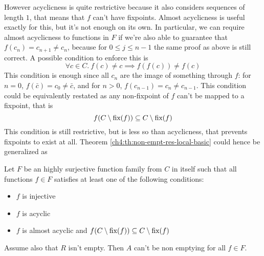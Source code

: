 However acyclicness is quite restrictive because it also considers sequences of length $1$, that means that $f$ can't have fixpoints. Almost acyclicness is useful exactly for this, but it's not enough on its own.
In particular, we can require almost acyclicness to functions in $F$ if we're also able to guarantee that $f(c_n) = c_{n+1} \neq c_n$, because for $0 \le j \le n - 1$ the same proof as above is still correct. A possible condition to enforce this is
\[
\forall c \in C.\ f(c) \neq c \implies f(f(c)) \neq f(c)
\]
This condition is enough since all $c_n$ are the image of something through $f$: for $n = 0$, $f(\bar{c})= c_0 \neq \bar{c}$, and for $n > 0$, $f(c_{n-1}) = c_n \neq c_{n-1}$.
This condition could be equivalently restated as any non-fixpoint of $f$ can't be mapped to a fixpoint, that is
\[
f(C \setminus \text{fix}(f)) \subseteq C \setminus \text{fix}(f)
\]
This condition is still restrictive, but is less so than acyclicness, that prevents fixpoints to exist at all.
Theorem \ref{ch4:th:non-empt-res-local-basic} could hence be generalized as
\begin{theorem}\label{ch4:th:non-empt-res-local}
	Let $F$ be an highly surjective function family from $C$ in itself such that all functions $f \in F$ satisfies at least one of the following conditions:
	\begin{itemize}
		\item $f$ is injective
		\item $f$ is acyclic
		\item $f$ is almost acyclic and $f(C \setminus \text{fix}(f)) \subseteq C \setminus \text{fix}(f)$
	\end{itemize}
	Assume also that $R$ isn't empty. Then $A$ can't be non emptying for all $f \in F$.
\end{theorem}

